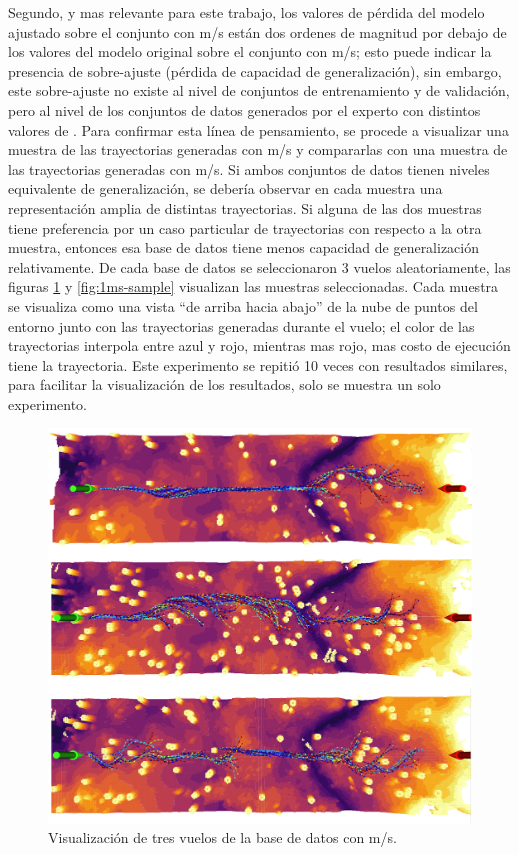 Segundo, y mas relevante para este trabajo, los valores de pérdida del modelo ajustado sobre el conjunto con  m/s están dos ordenes de magnitud por debajo de los valores del modelo original sobre el conjunto con  m/s; esto puede indicar la presencia de sobre-ajuste (pérdida de capacidad de generalización), sin embargo, este sobre-ajuste no existe al nivel de conjuntos de entrenamiento y de validación, pero al nivel de los conjuntos de datos generados por el experto con distintos valores de . Para confirmar esta línea de pensamiento, se procede a visualizar una muestra de las trayectorias generadas con  m/s y compararlas con una muestra de las trayectorias generadas con  m/s. Si ambos conjuntos de datos tienen niveles equivalente de generalización, se debería observar en cada muestra una representación amplia de distintas trayectorias. Si alguna de las dos muestras tiene preferencia por un caso particular de trayectorias con respecto a la otra muestra, entonces esa base de datos tiene menos capacidad de generalización relativamente. De cada base de datos se seleccionaron 3 vuelos aleatoriamente, las figuras \ref{fig:7ms-sample} y \ref{fig:1ms-sample} visualizan las muestras seleccionadas. Cada muestra se visualiza como una vista ``de arriba hacia abajo'' de la nube de puntos del entorno junto con las trayectorias generadas durante el vuelo; el color de las trayectorias interpola entre azul y rojo, mientras mas rojo, mas costo de ejecución tiene la trayectoria. Este experimento se repitió 10 veces con resultados similares, para facilitar la visualización de los resultados, solo se muestra un solo experimento.

\begin{figure}[H]
    \centering
    \includegraphics[scale=0.4]{partes/img/7ms-sample.png}
    \caption[Visualización de tres vuelos de la base de datos con  m/s.]{Visualización de tres vuelos de la base de datos con  m/s.}
    \label{fig:7ms-sample}
\end{figure}

